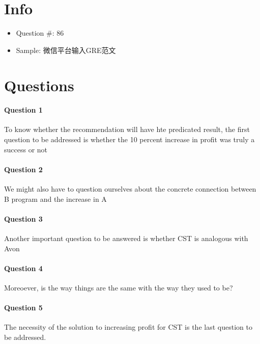 \documentclass{article}
\begin{document}
  \section{Info}
    \begin{itemize}
      \item Question \#: 86
      \item Sample: 微信平台输入GRE范文
    \end{itemize}

  \section{Questions}

    \paragraph{Question 1}
    To know whether the recommendation will have hte predicated result,
    the first question to be addressed is whether the 10 percent increase
    in profit was truly a success or not

    \paragraph{Question 2}
    We might also have to question ourselves about the concrete connection
    between B program and the increase in A

    \paragraph{Question 3}
    Another important question to be answered is whether CST is analogous with
    Avon

    \paragraph{Question 4}
    Moreoever, is the way things are the same with the way they used to be?

    \paragraph{Question 5}
    The necessity of the solution to increasing profit for CST is the last
    question to be addressed.
\end{document}

